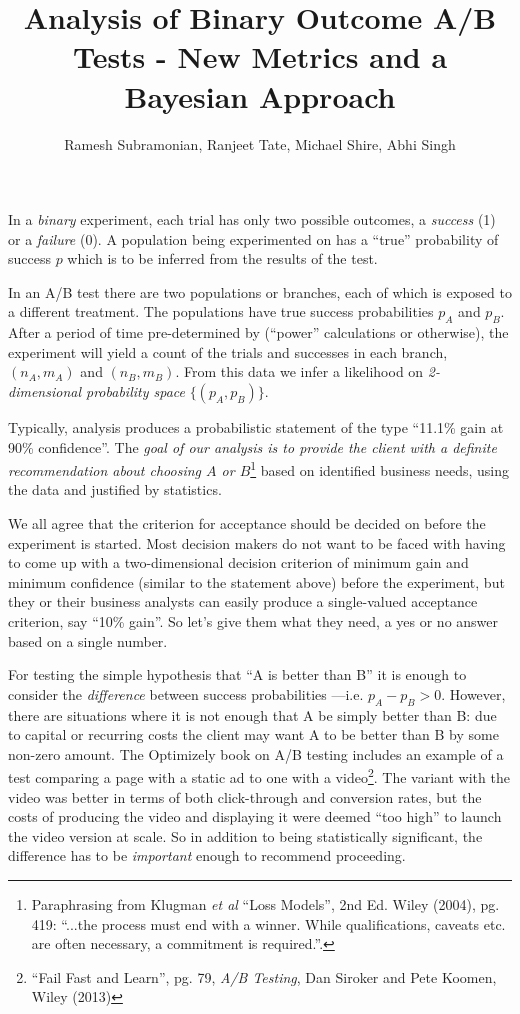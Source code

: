\documentclass[letterpaper,12pt]{article}
\begin{document}
\title{Analysis of Binary Outcome A/B Tests - New Metrics and a Bayesian Approach}
\author{ Ramesh Subramonian, Ranjeet Tate, Michael Shire, Abhi Singh}
\maketitle
\thispagestyle{fancy}
\lhead{}
\chead{}
\rhead{}
\lfoot{}

In a {\em binary} experiment, each trial has only two possible
outcomes, a {\em success} (1) or a {\em failure} (0).  A population
being experimented on has a ``true'' probability of success \(p\)
which is to be inferred from the results of the test.

In an A/B test there are two populations or branches, each of which is
exposed to a different treatment. The populations have true success
probabilities \(p_A\) and \(p_B\). After a period of time
pre-determined by (``power'' calculations or otherwise), the
experiment will yield a count of the trials and successes in each
branch, \((n_A, m_A)\) and \((n_B, m_B)\). From this data we infer a
likelihood on {\em 2-dimensional probability space} \(\{(p_A,p_B)\}\).

Typically, analysis produces a probabilistic statement of the type
``11.1\% gain at 90\% confidence''.  The {\em goal of our analysis is
  to provide the client with a definite recommendation about choosing
  \(A\) or \(B\)}\footnote{Paraphrasing from Klugman {\em et al}
  ``Loss Models'', 2nd Ed. Wiley (2004), pg. 419: ``...the process
  must end with a winner. While qualifications, caveats etc. are often
  necessary, a commitment is required.''.} based on identified
business needs, using the data and justified by statistics.

We all agree that the criterion for acceptance should be decided on
before the experiment is started. Most decision makers do not want to
be faced with having to come up with a two-dimensional decision
criterion of minimum gain and minimum confidence (similar to the
statement above) before the experiment, but they or their business
analysts can easily produce a single-valued acceptance criterion, say
``10\% gain''. So let's give them what they need, a yes or no answer
based on a single number.

For testing the simple hypothesis that ``A is better than B'' it is
enough to consider the {\em difference} between success probabilities
---i.e. \(p_A-p_B>0\). However, there are situations where it is not
enough that A be simply better than B: due to capital or recurring
costs the client may want A to be better than B by some non-zero
amount. The Optimizely book on A/B testing includes an example of a
test comparing a page with a static ad to one with a
video\footnote{``Fail Fast and Learn'', pg. 79, {\em A/B Testing}, Dan
  Siroker and Pete Koomen, Wiley (2013)}. The variant with the video
was better in terms of both click-through and conversion rates, but
the costs of producing the video and displaying it were deemed ``too
high'' to launch the video version at scale. So in addition to being
statistically significant, the difference has to be {\em important}
enough to recommend proceeding.
\end{document}

